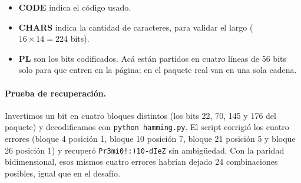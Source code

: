 \documentclass[11pt,a4paper]{article}
\begin{document}
\begin{itemize}
  \item \textbf{CODE} indica el código usado.
  \item \textbf{CHARS} indica la cantidad de caracteres, para validar el largo ($16 \times 14 = 224$ bits).
  \item \textbf{PL} son los bits codificados. Acá están partidos en cuatro líneas de 56 bits solo para que entren en la página; en el paquete real van en una sola cadena.
\end{itemize}

\paragraph{Prueba de recuperación.} Invertimos un bit en cuatro bloques distintos (los bits 22, 70, 145 y 176 del paquete) y decodificamos con \texttt{python hamming.py}. El script corrigió los cuatro errores (bloque 4 posición 1, bloque 10 posición 7, bloque 21 posición 5 y bloque 26 posición 1) y recuperó \texttt{Pr3mi0!:)10-dIeZ} sin ambigüedad. Con la paridad bidimensional, esos mismos cuatro errores habrían dejado 24 combinaciones posibles, igual que en el desafío.
\end{document}
